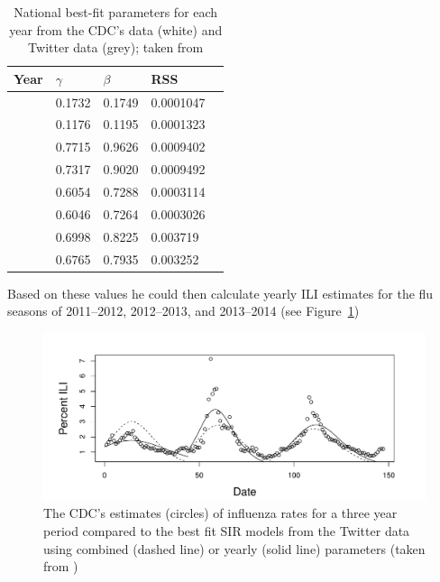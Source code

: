 \documentclass[11pt, a4paper,twoside]{report}\usepackage[]{graphicx}\usepackage[]{color}
\begin{document}
\begin{table}[H]
\centering
\caption{National best-fit parameters for each year from the CDC's data (white) and Twitter data (grey); taken from \cite{bodnar_data_2015}}
\begin{tabular}{l l l l l}

 Year & \(\gamma\) & \(\beta\) & RSS\\ \hline
& 0.1732 & 0.1749  & 0.0001047   \\ 
 {\multirow{-2}{*}{ 2011-2012 }}  & \cellcolor{grey}0.1176  & \cellcolor{grey}0.1195  & \cellcolor{grey}0.0001323  \\ \cline{2-4}
  {\multirow{2}{*}{ 2012-2013 }}& 0.7715 & 0.9626 & 0.0009402   \\ 
   & \cellcolor{grey}0.7317  & \cellcolor{grey}0.9020 & \cellcolor{grey}0.0009492   \\ \cline{2-4}
  {\multirow{2}{*}{ 2013-2014 }}& 0.6054 & 0.7288   & 0.0003114   \\ 
   & \cellcolor{grey}0.6046 & \cellcolor{grey}0.7264 & \cellcolor{grey}0.0003026  \\ \cline{2-4}
  {\multirow{2}{*}{ Combined }}& 0.6998 & 0.8225  & 0.003719   \\ 
   & \cellcolor{grey}0.6765  & \cellcolor{grey}0.7935  & \cellcolor{grey}0.003252   \\ 
\end{tabular}
\label{tab:nationalparams}
\end{table}

Based on these values he could then calculate yearly ILI estimates for the flu seasons of 2011--2012, 2012--2013, and 2013--2014 (see Figure~\ref{fig:cdc_fit_bodnar_thesis_SIR})\newline

\begin{figure}[H]
  \centering
    \includegraphics[width=.9\textwidth]{todd_bodnar_SIR.png}
  \caption{The CDC's estimates (circles) of influenza rates for a three year period compared to the best fit SIR models from the Twitter data using combined (dashed line) or yearly (solid line) parameters (taken from \cite{bodnar_data_2015})}
  \label{fig:cdc_fit_bodnar_thesis_SIR}
  \end{figure}
\end{document}
